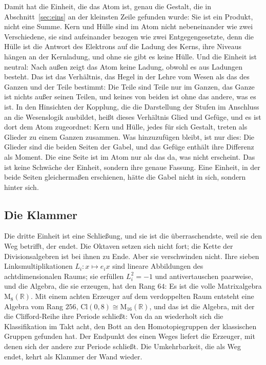 \documentclass[11pt,a4paper]{article}
\newcommand{\Randlesart}{\marginpar{\raggedright\footnotesize\textcolor{lesart}{$\bigcirc$\,Lesart}}}
\newcommand{\R}{\mathbb R}
\newcommand{\Cl}{\mathrm{Cl}}
\newcommand{\M}{\mathrm M}
\begin{document}
\Randlesart Damit hat die Einheit, die das Atom ist, genau die Gestalt, die in Abschnitt~\ref{sec:eins} an der kleinsten Zeile gefunden wurde: Sie ist ein Produkt, nicht eine Summe. Kern und Hülle sind im Atom nicht nebeneinander wie zwei Verschiedene, sie sind aufeinander bezogen wie zwei Entgegengesetzte, denn die Hülle ist die Antwort des Elektrons auf die Ladung des Kerns, ihre Niveaus hängen an der Kernladung, und ohne sie gibt es keine Hülle. Und die Einheit ist neutral: Nach außen zeigt das Atom keine Ladung, obwohl es aus Ladungen besteht. Das ist das Verhältnis, das Hegel in der Lehre vom Wesen als das des Ganzen und der Teile bestimmt: Die Teile sind Teile nur im Ganzen, das Ganze ist nichts außer seinen Teilen, und keines von beiden ist ohne das andere, was es ist. In den Hinsichten der Kopplung, die die Darstellung der Stufen im Anschluss an die Wesenslogik ausbildet, heißt dieses Verhältnis Glied und Gefüge, und es ist dort dem Atom zugeordnet: Kern und Hülle, jedes für sich Gestalt, treten als Glieder zu einem Ganzen zusammen. Was hinzuzufügen bleibt, ist nur dies: Die Glieder sind die beiden Seiten der Gabel, und das Gefüge enthält ihre Differenz als Moment. Die eine Seite ist im Atom nur als das da, was nicht erscheint. Das ist keine Schwäche der Einheit, sondern ihre genaue Fassung. Eine Einheit, in der beide Seiten gleichermaßen erschienen, hätte die Gabel nicht in sich, sondern hinter sich.

\subsection{Die Klammer}

Die dritte Einheit ist eine Schließung, und sie ist die überraschendste, weil sie den Weg betrifft, der endet. Die Oktaven setzen sich nicht fort; die Kette der Divisionsalgebren ist bei ihnen zu Ende. Aber sie verschwinden nicht. Ihre sieben Linksmultiplikationen $L_i\colon x\mapsto e_ix$ sind lineare Abbildungen des achtdimensionalen Raums; sie erfüllen $L_i^2=-1$ und antivertauschen paarweise, und die Algebra, die sie erzeugen, hat den Rang $64$: Es ist die volle Matrixalgebra $\M_8(\R)$. Mit einem achten Erzeuger auf dem verdoppelten Raum entsteht eine Algebra vom Rang $256$, $\Cl(0,8)\cong\M_{16}(\R)$, und das ist die Algebra, mit der die Clifford-Reihe ihre Periode schließt: Von da an wiederholt sich die Klassifikation im Takt acht, den Bott an den Homotopiegruppen der klassischen Gruppen gefunden hat. Der Endpunkt des einen Weges liefert die Erzeuger, mit denen sich der andere zur Periode schließt. Die Umkehrbarkeit, die als Weg endet, kehrt als Klammer der Wand wieder.
\end{document}
